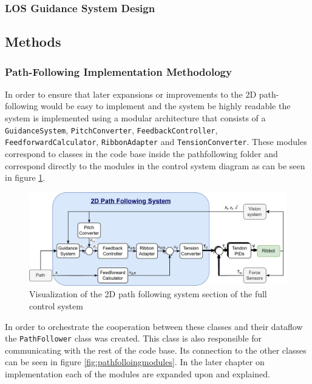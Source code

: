 \subsubsection{LOS Guidance System Design}



\subsection{Methods}

\subsubsection{Path-Following Implementation Methodology}
In order to ensure that later expansions or improvements to the 2D path-following would be easy to implement and the system be highly readable the  system is implemented using a modular architecture that consists of a \texttt{GuidanceSystem}, \texttt{PitchConverter}, \texttt{FeedbackController}, \texttt{FeedforwardCalculator}, \texttt{RibbonAdapter} and \texttt{TensionConverter}. These modules correspond to classes in the code base inside the pathfollowing folder and correspond directly to the modules in the control system diagram as can be seen in figure \ref{fig:2DpathfollowingSystemControlDiag}. 

\begin{figure} [H]
    \centering
    \includegraphics[width=\linewidth]{images/RibbotControl_2Dpathfollowing400p.png}
    \caption{Visualization of the 2D path following system section of the full control system}
    \label{fig:2DpathfollowingSystemControlDiag}
\end{figure}

In order to orchestrate the cooperation between these classes and their dataflow the \texttt{PathFollower} class was created. This class is also responsible for communicating with the rest of the code base. Its connection to the other classes can be seen in figure \ref{fig:pathfolloingmodules}.   In the later chapter on implementation each of the modules are expanded upon and explained.

